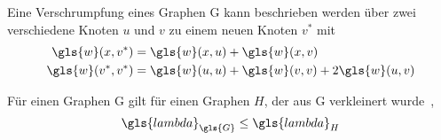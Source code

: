 Eine Verschrumpfung eines Graphen \gls{G} kann beschrieben werden über zwei verschiedene Knoten $u$ und $v$ zu einem neuen Knoten $v^*$ mit
\begin{align}
  \gls{w}\left(x,v^*\right) &= \gls{w}\left(x, u\right) + \gls{w}\left(x, v\right)\\
  \gls{w}\left(v^*, v^*\right) &= \gls{w}\left(u, u\right) + \gls{w}\left(v, v\right) + 2\gls{w}\left(u,v\right)
\end{align}

Für einen Graphen \gls{G} gilt für einen Graphen $H$, der aus \gls{G} verkleinert wurde~\cite{Chung},
\begin{equation}
  \gls{lambda}_{\gls{G}} \leq \gls{lambda}_H
\end{equation}
